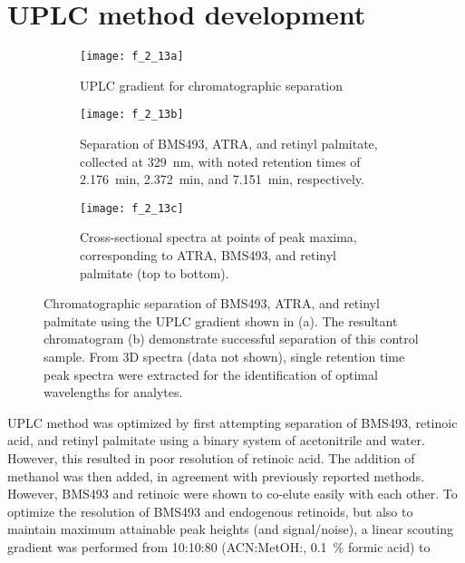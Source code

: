 \section{UPLC method development}
\label{sec:uplc_method}
\begin{figure}[h!] \centering \begin{subfigure}[b]{0.7\textwidth}
        \texttt{[image: f\_2\_13a]} \caption{UPLC gradient for
        chromatographic separation} \label{fig:uplc_gradient} \end{subfigure}
    \begin{subfigure}[b]{0.7\textwidth}
        \texttt{[image: f\_2\_13b]} \caption{Separation of BMS493, ATRA, and retinyl palmitate, collected at
            \SI{329}{\nm}, with noted retention times of \SI{2.176}{\minute},
            \SI{2.372}{\minute}, and \SI{7.151}{\minute}, respectively.}
        \label{fig:std_chromatogram} \end{subfigure}
    \begin{subfigure}[b]{0.7\textwidth}
        \texttt{[image: f\_2\_13c]} \caption{Cross-sectional
            spectra
            at points of peak maxima, corresponding to ATRA, BMS493, and retinyl
        palmitate (top to bottom).}
        \label{fig:retinoid_spectra} \end{subfigure}
    \caption[Chromatographic separation of BMS493, ATRA, and retinyl
    palmitate]{Chromatographic separation of BMS493, ATRA, and retinyl palmitate
        using the UPLC gradient shown in (a). The resultant chromatogram (b)
        demonstrate successful separation of this control sample. From 3D
        spectra (data not shown), single retention time peak spectra were
    extracted for the identification of optimal wavelengths for
analytes.}\label{fig:uplc_report} \end{figure}
UPLC method was optimized by first attempting separation of BMS493, retinoic
acid, and retinyl palmitate using a binary system of acetonitrile and water.
However, this resulted in poor resolution of retinoic acid. The addition of
methanol was then added, in agreement with previously reported
methods.\cite{DeLeenheer1982,Kane2008b,Wang2001a,Schaffer2010} However, BMS493
and retinoic were shown to co-elute easily with each other. To optimize the
resolution of BMS493 and endogenous retinoids, but also to maintain maximum
attainable peak heights (and signal/noise), a linear scouting gradient was
performed from 10:10:80 (ACN:MetOH:, \SI{0.1}{\percent} formic acid) to
